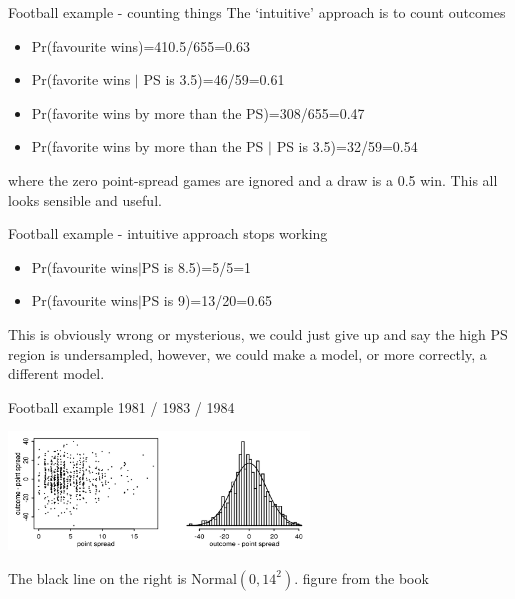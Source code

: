 \documentclass{beamer}
\newcommand{\cor}{\color{reddish}{}}
\newcommand{\cob}{\color{black}{}}
\begin{document}
\begin{frame}{Football example - counting things}
The `intuitive' approach is to count outcomes
\vskip 0.75cm
\begin{itemize}
  \item \cor{}Pr(favourite wins)=410.5/655=0.63\cob
  \item \cor{}Pr(favorite wins $|$ PS is 3.5)=46/59=0.61\cob
  \item \cor{}Pr(favorite wins by more than the PS)=308/655=0.47\cob
  \item \cor{}Pr(favorite wins by more than the PS $|$ PS is 3.5)=32/59=0.54\cob
\end{itemize}
\vskip 0.75cm
where the zero point-spread games are ignored and a draw is a 0.5 win. This all looks sensible and useful.
\end{frame}

\begin{frame}{Football example - intuitive approach stops working}
 
  \begin{itemize}
  \item \cor{}Pr(favourite wins$|$PS is 8.5)=5/5=1\cob
  \item \cor{}Pr(favourite wins$|$PS is 9)=13/20=0.65\cob
  \end{itemize}
\vskip 0.75cm
  This is obviously wrong or mysterious, we could just give up and say the high PS region is undersampled, however, we could make a model, or more correctly, a different model.
\end{frame}


\begin{frame}{Football example 1981 / 1983 / 1984}

\begin{center}
    \includegraphics[width=8cm]{football_noise.png}
\end{center}
The black line on the right is \cor{}Normal$(0,14^2)$\cob.
\vfill
\color{gray}figure from the book\cob
\end{frame}
\end{document}
